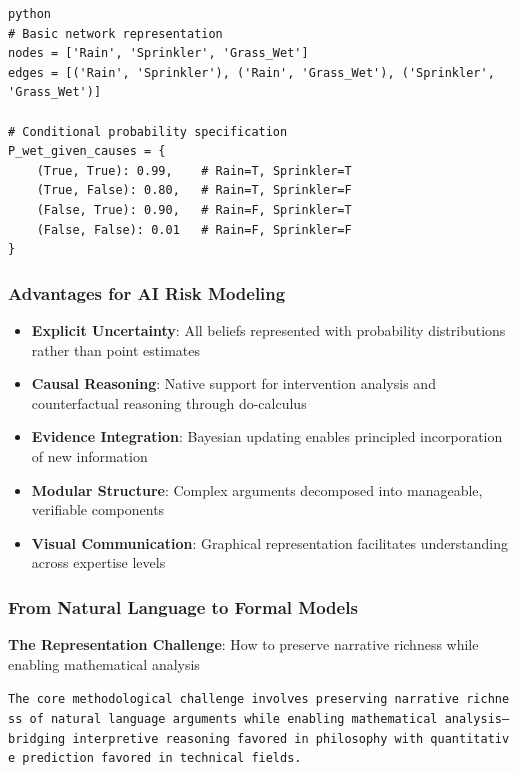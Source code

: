 \documentclass[
  11pt,
  letterpaper,
]{book}
\providecommand{\tightlist}{%
  \setlength{\itemsep}{0pt}\setlength{\parskip}{0pt}}
\begin{document}
\begin{verbatim}
python
# Basic network representation
nodes = ['Rain', 'Sprinkler', 'Grass_Wet']
edges = [('Rain', 'Sprinkler'), ('Rain', 'Grass_Wet'), ('Sprinkler', 'Grass_Wet')]

# Conditional probability specification
P_wet_given_causes = {
    (True, True): 0.99,    # Rain=T, Sprinkler=T
    (True, False): 0.80,   # Rain=T, Sprinkler=F  
    (False, True): 0.90,   # Rain=F, Sprinkler=T
    (False, False): 0.01   # Rain=F, Sprinkler=F
}
\end{verbatim}

\subsubsection{Advantages for AI Risk
Modeling}\label{sec-modeling-advantages}

\begin{itemize}
\tightlist
\item
  \textbf{Explicit Uncertainty}: All beliefs represented with
  probability distributions rather than point estimates
\item
  \textbf{Causal Reasoning}: Native support for intervention analysis
  and counterfactual reasoning through do-calculus
\item
  \textbf{Evidence Integration}: Bayesian updating enables principled
  incorporation of new information
\item
  \textbf{Modular Structure}: Complex arguments decomposed into
  manageable, verifiable components
\item
  \textbf{Visual Communication}: Graphical representation facilitates
  understanding across expertise levels
\end{itemize}

\subsubsection{From Natural Language to Formal
Models}\label{sec-natural-to-formal}

\textbf{The Representation Challenge}: How to preserve narrative
richness while enabling mathematical analysis

\texttt{The\ core\ methodological\ challenge\ involves\ preserving\ narrative\ richness\ of\ natural\ language\ arguments\ while\ enabling\ mathematical\ analysis—bridging\ interpretive\ reasoning\ favored\ in\ philosophy\ with\ quantitative\ prediction\ favored\ in\ technical\ fields.}
\end{document}
